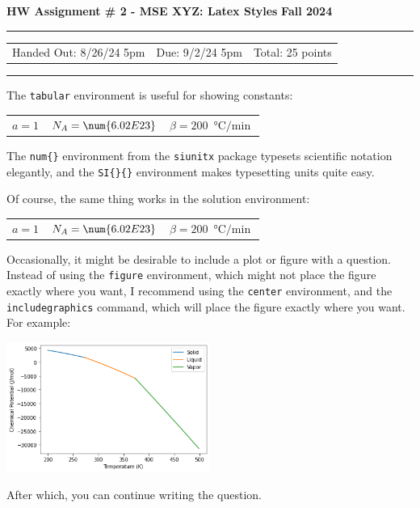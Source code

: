 \centering
\textbf{HW Assignment \# 2 - MSE XYZ: Latex Styles} \dotfill \textbf{Fall 2024}

\rule{\textwidth}{0.4pt}
\begin{center}
\begin{tabular}{c | c | c}
     Handed Out: 8/26/24 5pm & Due: 9/2/24 5pm & Total: 25 points\\
\end{tabular}
\end{center}
\rule{\textwidth}{0.4pt}
\begin{questions}
\question[2]
The \verb|tabular| environment is useful for showing constants:
\begin{center}
    \begin{tabular}{c c c}
        $a=1$ & $N_A = \num{6.02E23}$ & $\beta=\SI{200}{\degreeCelsius\per\min}$
    \end{tabular}
\end{center}
The \verb|num{}| environment from the \verb|siunitx| package typesets scientific notation elegantly, and the \verb|SI{}{}| environment makes typesetting units quite easy.
\begin{solution}[1in]
Of course, the same thing works in the solution environment:
\begin{center}
    \begin{tabular}{c c c}
        $a=1$ & $N_A = \num{6.02E23}$ & $\beta=\SI{200}{\degreeCelsius\per\min}$
    \end{tabular}
\end{center}
\end{solution}

\question[3]
Occasionally, it might be desirable to include a plot or figure with a question.
Instead of using the \verb|figure| environment, which might not place the figure exactly where you want, I recommend using the \verb|center| environment, and the \verb|includegraphics| command, which will place the figure exactly where you want.
For example:\\
\begin{center}
    \includegraphics[width=0.5\textwidth,keepaspectratio]{figures/equilibriumplot.png}
\end{center}
After which, you can continue writing the question.


\end{questions}
